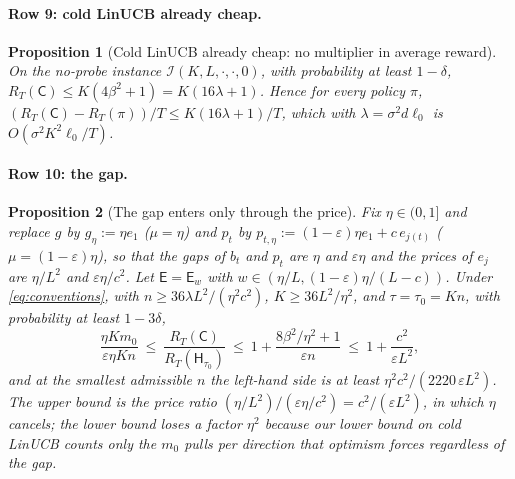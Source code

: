 \documentclass{article}
\newtheorem{proposition}{Proposition}
\theoremstyle{definition}
\theoremstyle{remark}
\newcommand{\eps}{\varepsilon}
\theoremstyle{remark}
\newcommand{\Cold}{\mathsf{C}}
\newcommand{\Exp}{\mathsf{E}}
\newcommand{\Hyb}{\mathsf{H}}
\begin{document}
\paragraph{Row 9: cold LinUCB already cheap.}
\begin{proposition}[Cold LinUCB already cheap: no multiplier in average reward]
\label{prop:cat-cheap}
On the no-probe instance $\mathcal I(K,L,\cdot,\cdot,0)$, with probability
at least $1-\delta$, $R_T(\Cold)\le K(4\beta^2+1)=K(16\lambda+1)$. Hence for
\emph{every} policy $\pi$, $(R_T(\Cold)-R_T(\pi))/T\le K(16\lambda+1)/T$, which with
$\lambda=\sigma^2d\ell_0$ is $O(\sigma^2K^2\ell_0/T)$.
\end{proposition}

\paragraph{Row 10: the gap.}
\begin{proposition}[The gap enters only through the price]
\label{prop:cat-gap}
Fix $\eta\in(0,1]$ and replace $g$ by $g_\eta:=\eta e_1$ ($\mu=\eta$) and
$p_t$ by $p_{t,\eta}:=(1-\eps)\eta e_1+c\,e_{j(t)}$ ($\mu=(1-\eps)\eta$), so that
the gaps of $b_t$ and $p_t$ are $\eta$ and $\eps\eta$ and the prices of
$e_j$ are $\eta/L^2$ and $\eps\eta/c^2$. Let $\Exp=\Exp_w$ with
$w\in(\eta/L,(1-\eps)\eta/(L-c))$. Under \eqref{eq:conventions}, with
$n\ge36\lambda L^2/(\eta^2c^2)$, $K\ge36L^2/\eta^2$, and $\tau=\tau_0=Kn$, with
probability at least $1-3\delta$,
\[
\frac{\eta Km_0}{\eps\eta Kn}\ \le\
\frac{R_T(\Cold)}{R_T(\Hyb_{\tau_0})}\ \le\ 1+\frac{8\beta^2/\eta^2+1}{\eps n}\ \le\ 1+\frac{c^2}{\eps L^2},
\]
and at the smallest admissible $n$ the left-hand side is at least
$\eta^2c^2/(2220\,\eps L^2)$.
The upper bound is the price ratio $(\eta/L^2)/(\eps\eta/c^2)=c^2/(\eps L^2)$,
in which $\eta$ cancels; the lower bound loses a factor $\eta^2$ because our
lower bound on cold LinUCB counts only the $m_0$ pulls per direction that
optimism forces regardless of the gap.
\end{proposition}
\end{document}
